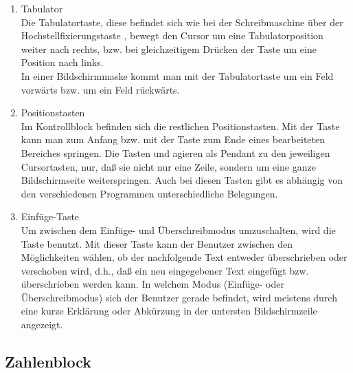 \begin{enumerate}
\item Tabulator  \\

Die Tabulatortaste, diese befindet sich wie bei der Schreibmaschine
\"{u}ber der Hochstellfixierungstaste , bewegt den Cursor um eine
Tabulatorposition weiter nach rechts, bzw. bei gleichzeitigem Dr\"{u}cken der
Taste  um eine Position nach links.\\
In einer Bildschirmmaske kommt man mit der Tabulatortaste um ein Feld
vorw\"{a}rts bzw. um ein Feld r\"{u}ckw\"{a}rts.

\item Positionstasten  \\

Im Kontrollblock befinden sich die restlichen Positionstasten.
Mit der Taste  kann man zum Anfang bzw. mit der Taste
 zum Ende eines bearbeiteten Bereiches springen.
Die Tasten  und 
agieren als Pendant zu den jeweiligen Cursortasten, nur, da{\ss} sie
nicht nur eine Zeile, sondern um eine ganze Bildschirmseite
weiterspringen. Auch bei diesen Tasten gibt es abh\"{a}ngig von den
verschiedenen Programmen unterschiedliche Belegungen.

\item Einf\"{u}ge-Taste  \\

Um zwischen dem Einf\"{u}ge- und \"{U}berschreibmodus umzuschalten,
wird die Taste  benutzt. Mit dieser Taste kann der
Benutzer zwischen den M\"{o}glichkeiten w\"{a}hlen, ob der
nachfolgende Text entweder \"{u}ber\-schrieben oder verschoben
wird, d.h., da{\ss} ein neu eingegebener Text eingef\"{u}gt bzw.
\"{u}berschrieben werden kann. In welchem Modus (Einf\"{u}ge- oder
\"{U}berschreibmodus) sich der Benutzer gerade befindet, wird
meistens durch eine kurze Erkl\"{a}rung oder Abk\"{u}rzung in der
untersten Bildschirmzeile angezeigt.
\end{enumerate}

\subsection{Zahlenblock} 


